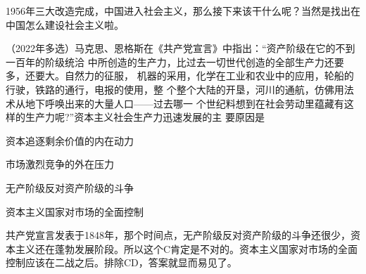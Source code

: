 \documentclass[lang=cn,newtx,10pt,scheme=chinese,pad,twocol]{zznote}
\begin{document}
\begin{solution}
	1956年三大改造完成，中国进入社会主义，那么接下来该干什么呢？当然是找出在中国怎么建设社会主义啦。
\end{solution}
\begin{example} （2022年多选）马克思、恩格斯在《共产党宣言》中指出：“资产阶级在它的不到一百年的阶级统洽
	中所创造的生产力，比过去一切世代创造的全部生产力还要多，还要大。自然力的征服，
	机器的采用，化学在工业和农业中的应用，轮船的行驶，铁路的通行，电报的使用，整
	个整个大陆的开垦，河川的通航，仿佛用法术从地下呼唤出来的大量人口——过去哪一
	个世纪料想到在社会劳动里蕴藏有这样的生产力呢?”资本主义社会生产力迅速发展的主
	要原因是

	\begin{choice}
		\item 资本追逐剩余价值的内在动力
		\item 市场激烈竞争的外在压力
		\item 无产阶级反对资产阶级的斗争
		\item 资本主义国家对市场的全面控制
	\end{choice}
\end{example}
\begin{solution}
	共产党宣言发表于1848年，那个时间点，无产阶级反对资产阶级的斗争还很少，资本主义还在蓬勃发展阶段。所以这个C肯定是不对的。资本主义国家对市场的全面控制应该在二战之后。排除CD，答案就显而易见了。
\end{solution}
\end{document}
